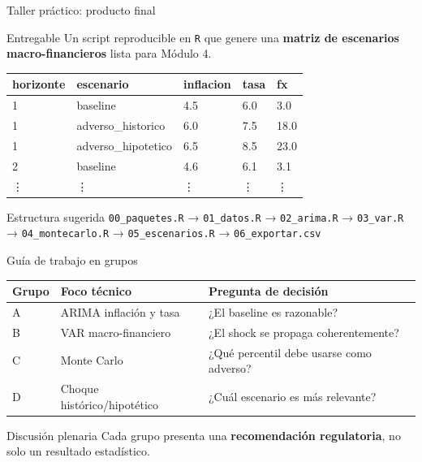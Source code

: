 \documentclass[10pt,aspectratio=169]{beamer}
\newcommand{\R}{\texttt{R}}
\begin{document}
\begin{frame}{Taller práctico: producto final}
\begin{block}{Entregable}
Un script reproducible en \R{} que genere una \textbf{matriz de escenarios macro-financieros} lista para Módulo 4.
\end{block}

\begin{table}
\tiny
\begin{tabular}{lllll}
\toprule
horizonte & escenario & inflacion & tasa & fx \\
\midrule
1 & baseline & 4.5 & 6.0 & 3.0 \\
1 & adverso\_historico & 6.0 & 7.5 & 18.0 \\
1 & adverso\_hipotetico & 6.5 & 8.5 & 23.0 \\
2 & baseline & 4.6 & 6.1 & 3.1 \\
\vdots & \vdots & \vdots & \vdots & \vdots \\
\bottomrule
\end{tabular}
\end{table}

\begin{block}{Estructura sugerida}
\texttt{00\_paquetes.R} → \texttt{01\_datos.R} → \texttt{02\_arima.R} → \texttt{03\_var.R} → \texttt{04\_montecarlo.R} → \texttt{05\_escenarios.R} → \texttt{06\_exportar.csv}
\end{block}
\end{frame}

\begin{frame}{Guía de trabajo en grupos}
\begin{table}
\small
\begin{tabular}{p{2.7cm}p{4.2cm}p{4.2cm}}
\toprule
Grupo & Foco técnico & Pregunta de decisión \\
\midrule
A & ARIMA inflación y tasa & ¿El baseline es razonable? \\
B & VAR macro-financiero & ¿El shock se propaga coherentemente? \\
C & Monte Carlo & ¿Qué percentil debe usarse como adverso? \\
D & Choque histórico/hipotético & ¿Cuál escenario es más relevante? \\
\bottomrule
\end{tabular}
\end{table}

\begin{block}{Discusión plenaria}
Cada grupo presenta una \textbf{recomendación regulatoria}, no solo un resultado estadístico.
\end{block}
\end{frame}
\end{document}
